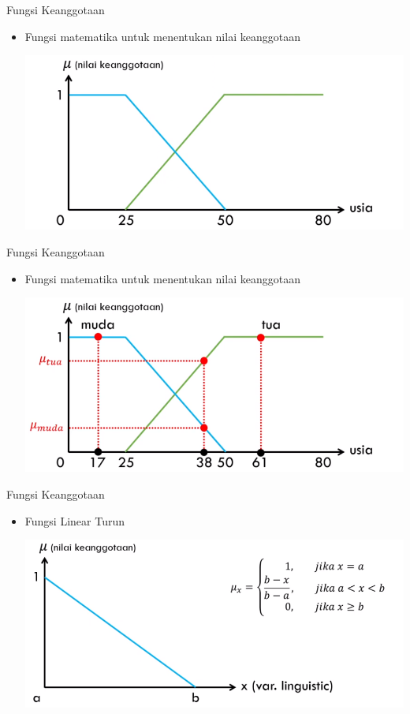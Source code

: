 \documentclass[pdflatex,compress,mathserif]{beamer}
\begin{document}
\begin{frame}{Fungsi Keanggotaan}
	\begin{itemize}
		\item Fungsi matematika untuk menentukan nilai keanggotaan
		\begin{center}
			\includegraphics[width=0.7\linewidth]{img/11}
		\end{center}
	\end{itemize}
\end{frame}

\begin{frame}{Fungsi Keanggotaan}
	\begin{itemize}
		\item Fungsi matematika untuk menentukan nilai keanggotaan
		\begin{center}
			\includegraphics[width=0.7\linewidth]{img/13}
		\end{center}
	\end{itemize}
\end{frame}

\begin{frame}{Fungsi Keanggotaan}
	\begin{itemize}
		\item Fungsi Linear Turun
		\begin{center}
			\includegraphics[width=\linewidth]{img/14}
		\end{center}
	\end{itemize}
 \end{frame}
\end{document}
